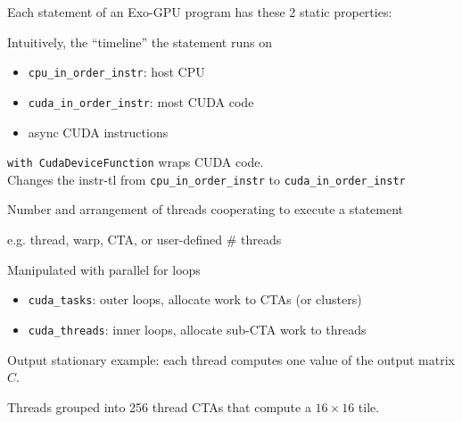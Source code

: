\begin{minipage}[t]{0.48\textwidth}\fixminipage

Each statement of an Exo-GPU program has these 2 static properties:


Intuitively, the ``timeline'' the statement runs on
\begin{itemize}
  \item \texttt{cpu\_in\_order\_instr}: host CPU
  \item \texttt{cuda\_in\_order\_instr}: most CUDA code
  \item async CUDA instructions
\end{itemize}
\texttt{with CudaDeviceFunction} wraps CUDA code.\\
Changes the instr-tl from \texttt{cpu\_in\_order\_instr} to \texttt{cuda\_in\_order\_instr}


Number and arrangement of threads cooperating to execute a statement

e.g. thread, warp, CTA, or user-defined \# threads

Manipulated with parallel for loops

\begin{itemize}
  \item \texttt{cuda\_tasks}: outer loops, allocate work to CTAs (or clusters)
  \item \texttt{cuda\_threads}: inner loops, allocate sub-CTA work to threads
\end{itemize}
\end{minipage}

\newpage
{}

Output stationary example: each thread computes one value of the output matrix $C$.

Threads grouped into 256 thread CTAs that compute a $16 \times 16$ tile.

\vspace{-2mm}

\newpage
{}



\newpage
{}



\newpage
{}



